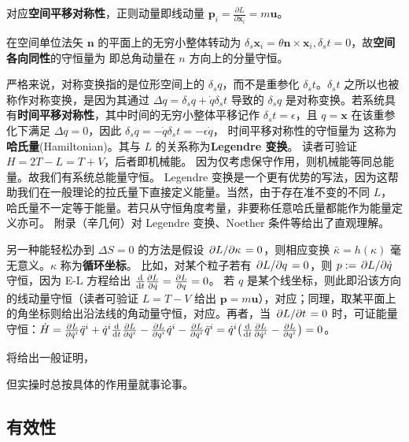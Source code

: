 对应\textbf{空间平移对称性}，正则动量即线动量 $\boldsymbol{p}_{i}=\frac{\partial L}{\partial \dot{\boldsymbol{x}}_{i}}=m\bm u$。 

在空间单位法矢 $\bm n$ 的平面上的无穷小整体转动为 $\delta_s \bm x_i=\theta\bm n\times\bm x_i,\delta_s t=0$，故\textbf{空间各向同性}的守恒量为
即总角动量在 $n$ 方向上的分量守恒。


严格来说，对称变换指的是位形空间上的 $\delta_s q$，而不是重参化 $\delta_s t$。$\delta_s t$ 之所以也被称作对称变换，是因为其通过 $\Delta q=\delta_s q+\dot q\delta_s t$ 导致的 $\delta_s q$ 是对称变换。若系统具有\textbf{时间平移对称性}，其中时间的无穷小整体平移记作 $\delta_s t=\epsilon$，且 $q=\bm x$ 在该重参化下满足 $\Delta q=0$，因此 $\delta_s q=-\dot q\delta_s t=-\epsilon\dot q$，
时间平移对称性的守恒量为
这称为\textbf{哈氏量}(Hamiltonian)。其与 $L$ 的关系称为\textbf{Legendre 变换}。
读者可验证 $H=2T-L=T+V$，后者即机械能。
因为仅考虑保守作用，则机械能等同总能量。故我们有系统总能量守恒。
Legendre 变换是一个更有优势的写法，因为这帮助我们在一般理论的拉氏量下直接定义能量。当然，由于存在准不变的不同 $L$，哈氏量不一定等于能量。若只从守恒角度考量，非要称任意哈氏量都能作为能量定义亦可。
附录（辛几何）对 Legendre 变换、Noether 条件等给出了直观理解。

另一种能轻松办到 $\Delta S=0$ 的方法是假设 $\pdv*{L}{\kappa}=0$，则相应变换 $\bar\kappa=h(\kappa)$ 毫无意义。$\kappa$ 称为\textbf{循环坐标}。
比如，对某个粒子若有 $\pdv*{L}{q}=0$，则 $p:=\pdv*{L}{\dot{q}}$ 守恒，因为 E-L 方程给出 $\dv{t} \pdv{L}{\dot q}=\pdv{L}{q}=0$。
若 $q$ 是某个线坐标，则此即沿该方向的线动量守恒（读者可验证 $L=T-V$ 给出 $\bm p=m\bm u$），对应；同理，取某平面上的角坐标则给出沿法线的角动量守恒，对应。再者，当 $\pdv*{L}{t}=0$ 时，可证能量守恒：$\dot H=\pdv{L}{\dot q^i}\ddot q^i+\dot q^i\dv{t}\pdv{L}{\dot q^i}-\pdv{L}{q^i}\dot q^i-\pdv{L}{\dot q^i}\ddot q^i=\dot q^i\big(\dv{t}\pdv{L}{\dot q^i}-\pdv{L}{q^i}\big)=0$。

 将给出一般证明，


但实操时总按具体的作用量就事论事。

\subsection{有效性}

